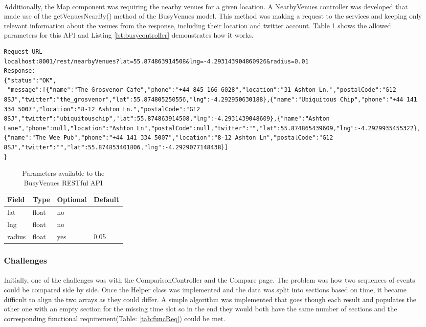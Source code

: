 \documentclass{l4proj}
\begin{document}
\paragraph{}
Additionally, the Map component was requiring the nearby venues for a given location. A NearbyVenues controller was developed that made use of the getVenuesNearBy() method of the BusyVenues model. This method was making a request to the services and keeping only relevant information about the venues from the response, including their location and twitter account. Table \ref{tab:venueapi} shows the allowed parameters for this API and Listing \ref{lst:busycontroller} demonstrates how it works.

\begin{lstlisting}[caption={Busy Venues API Request and Response},label={lst:busycontroller}]
Request URL
localhost:8001/rest/nearbyVenues?lat=55.874863914508&lng=-4.293143904860926&radius=0.01
Response:
{"status":"OK",
 "message":[{"name":"The Grosvenor Cafe","phone":"+44 845 166 6028","location":"31 Ashton Ln.","postalCode":"G12 8SJ","twitter":"the_grosvenor","lat":55.874805250556,"lng":-4.292950630188},{"name":"Ubiquitous Chip","phone":"+44 141 334 5007","location":"8-12 Ashton Ln.","postalCode":"G12 8SJ","twitter":"ubiquitouschip","lat":55.874863914508,"lng":-4.2931439048609},{"name":"Ashton Lane","phone":null,"location":"Ashton Ln","postalCode":null,"twitter":"","lat":55.874865439609,"lng":-4.2929935455322},{"name":"The Wee Pub","phone":"+44 141 334 5007","location":"8-12 Ashton Ln","postalCode":"G12 8SJ","twitter":"","lat":55.874853401806,"lng":-4.2929077148438}]
}
\end{lstlisting}
\begin{table}[H]
	\centering
	\begin{tabular}{|l|l|l|l|} \hline
		Field	&	Type	& Optional & Default\\ \hline
		lat 	& float & no  & \\ \hline
		lng 	& float & no  & \\ \hline
		radius 	& float & yes  & 0.05\\ \hline
	\end{tabular}
	\caption{Parameters available to the BusyVenues RESTful API}
	\label{tab:venueapi}
\end{table}

\subsubsection{Challenges}
\paragraph{}
Initially, one of the challenges was with the ComparisonController and the Compare page. The problem was how two sequences of events could be compared side by side. Once the Helper class was implemented and the data was split into sections based on time, it became difficult to align the two arrays as they could differ. A simple algorithm was implemented that goes though each result and populates the other one with an empty section for the missing time slot so in the end they would both have the same number of sections and the corresponding functional requirement(Table: \ref{tab:funcReq}) could be met. 
\end{document}
